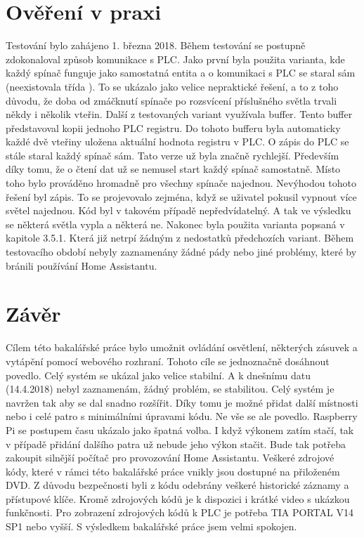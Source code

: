 \documentclass[a4paper,12pt,czech,bibliography=totoc]{scrbook}
\begin{document}
\chapter{Ověření v praxi}
Testování bylo zahájeno 1. března 2018. Během testování se postupně zdokonaloval způsob komunikace s PLC. Jako první byla použita varianta, kde každý spínač funguje jako samostatná entita a o komunikaci s PLC se staral sám (neexistovala třída ). To se ukázalo jako velice nepraktické řešení, a to z toho důvodu, že doba od zmáčknutí spínače po rozsvícení příslušného světla trvali někdy i několik vteřin. 
\newline
Další z testovaných variant využívala buffer. Tento buffer představoval kopii jednoho PLC registru. Do tohoto bufferu byla automaticky každé dvě vteřiny uložena aktuální hodnota registru v PLC. O zápis do PLC se stále staral každý spínač sám. Tato verze už byla značně rychlejší. Především díky tomu, že o čtení dat už se nemusel start každý spínač samostatně. Místo toho bylo prováděno hromadně pro všechny spínače najednou. Nevýhodou tohoto řešení byl zápis. To se projevovalo zejména, když se uživatel pokusil vypnout více světel najednou. Kód byl v takovém případě nepředvídatelný. A tak ve výsledku se některá světla vypla a některá ne.
\newline
Nakonec byla použita varianta popsaná v kapitole 3.5.1. Která již netrpí žádným z nedostatků předchozích variant.
\newline
Během testovacího období nebyly zaznamenány žádné pády nebo jiné problémy, které by bránili používání Home Assistantu.


 
\chapter{Závěr}
Cílem této bakalářské práce bylo umožnit ovládání osvětlení, některých zásuvek a vytápění pomocí webového rozhraní. Tohoto cíle se jednoznačně dosáhnout povedlo. Celý systém se ukázal jako velice stabilní. A k dnešnímu datu (14.4.2018) nebyl zaznamenám, žádný problém, se stabilitou. Celý systém je navržen tak aby se dal snadno rozšířit. Díky tomu je možné přidat další místnosti nebo i celé patro s minimálními úpravami kódu. Ne vše se ale povedlo. Raspberry Pi se postupem času ukázalo jako špatná volba. I když výkonem zatím stačí, tak v případě přidání dalšího patra už nebude jeho výkon stačit. Bude tak potřeba zakoupit silnější počítač pro provozování Home Assistantu.
\newline
\newline
Veškeré zdrojové kódy, které v rámci této bakalářské práce vnikly jsou dostupné na přiloženém DVD. Z důvodu bezpečnosti byli z kódu odebrány veškeré historické záznamy a přístupové klíče. Kromě zdrojových kódů je k dispozici i krátké video s ukázkou funkčnosti. Pro zobrazení zdrojových kódů k PLC je potřeba TIA PORTAL V14 SP1 nebo vyšší.
\newline
\newline
S výsledkem bakalářské práce jsem velmi spokojen.
\end{document}
